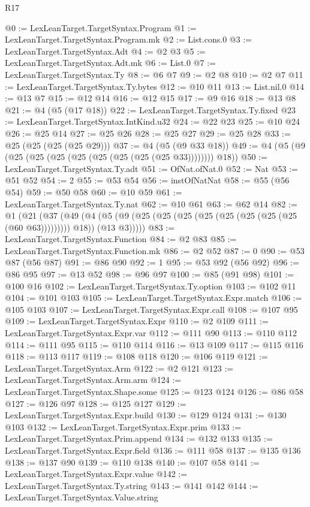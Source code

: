 \begin{lexlean}{R17}
\begin{coremodule}
@0 := LexLeanTarget.TargetSyntax.Program
@1 := LexLeanTarget.TargetSyntax.Program.mk
@2 := List.cons.{0}
@3 := LexLeanTarget.TargetSyntax.Adt
@4 := @2 @3
@5 := LexLeanTarget.TargetSyntax.Adt.mk
@6 := List.{0}
@7 := LexLeanTarget.TargetSyntax.Ty
@8 := @6 @7
@9 := @2 @8
@10 := @2 @7
@11 := LexLeanTarget.TargetSyntax.Ty.bytes
@12 := @10 @11
@13 := List.nil.{0}
@14 := @13 @7
@15 := @12 @14
@16 := @12 @15
@17 := @9 @16
@18 := @13 @8
@21 := @4 (@5 (@17 @18))
@22 := LexLeanTarget.TargetSyntax.Ty.fixed
@23 := LexLeanTarget.TargetSyntax.IntKind.u32
@24 := @22 @23
@25 := @10 @24
@26 := @25 @14
@27 := @25 @26
@28 := @25 @27
@29 := @25 @28
@33 := @25 (@25 (@25 (@25 @29)))
@37 := @4 (@5 (@9 @33 @18))
@49 := @4 (@5 (@9 (@25 (@25 (@25 (@25 (@25 (@25 (@25 (@25 @33)))))))) @18))
@50 := LexLeanTarget.TargetSyntax.Ty.adt
@51 := OfNat.ofNat.{0}
@52 := Nat
@53 := @51 @52
@54 := 2
@55 := @53 @54
@56 := instOfNatNat
@58 := @55 (@56 @54)
@59 := @50 @58
@60 := @10 @59
@61 := LexLeanTarget.TargetSyntax.Ty.nat
@62 := @10 @61
@63 := @62 @14
@82 := @1
    (@21
      (@37
        (@49
          (@4 (@5 (@9 (@25 (@25 (@25 (@25 (@25 (@25 (@25 (@25 (@60 @63))))))))) @18)) (@13 @3)))))
@83 := LexLeanTarget.TargetSyntax.Function
@84 := @2 @83
@85 := LexLeanTarget.TargetSyntax.Function.mk
@86 := @2 @52
@87 := 0
@90 := @53 @87 (@56 @87)
@91 := @86 @90
@92 := 1
@95 := @53 @92 (@56 @92)
@96 := @86 @95
@97 := @13 @52
@98 := @96 @97
@100 := @85 (@91 @98)
@101 := @100 @16
@102 := LexLeanTarget.TargetSyntax.Ty.option
@103 := @102 @11
@104 := @101 @103
@105 := LexLeanTarget.TargetSyntax.Expr.match
@106 := @105 @103
@107 := LexLeanTarget.TargetSyntax.Expr.call
@108 := @107 @95
@109 := LexLeanTarget.TargetSyntax.Expr
@110 := @2 @109
@111 := LexLeanTarget.TargetSyntax.Expr.var
@112 := @111 @90
@113 := @110 @112
@114 := @111 @95
@115 := @110 @114
@116 := @13 @109
@117 := @115 @116
@118 := @113 @117
@119 := @108 @118
@120 := @106 @119
@121 := LexLeanTarget.TargetSyntax.Arm
@122 := @2 @121
@123 := LexLeanTarget.TargetSyntax.Arm.arm
@124 := LexLeanTarget.TargetSyntax.Shape.some
@125 := @123 @124
@126 := @86 @58
@127 := @126 @97
@128 := @125 @127
@129 := LexLeanTarget.TargetSyntax.Expr.build
@130 := @129 @124
@131 := @130 @103
@132 := LexLeanTarget.TargetSyntax.Expr.prim
@133 := LexLeanTarget.TargetSyntax.Prim.append
@134 := @132 @133
@135 := LexLeanTarget.TargetSyntax.Expr.field
@136 := @111 @58
@137 := @135 @136
@138 := @137 @90
@139 := @110 @138
@140 := @107 @58
@141 := LexLeanTarget.TargetSyntax.Expr.value
@142 := LexLeanTarget.TargetSyntax.Ty.string
@143 := @141 @142
@144 := LexLeanTarget.TargetSyntax.Value.string

\end{coremodule}
\end{lexlean}
